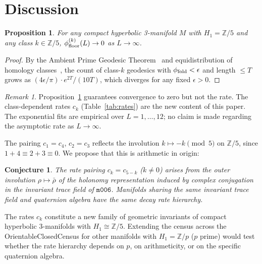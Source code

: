 \documentclass[11pt,a4paper]{article}
\newtheorem{proposition}{Proposition}
\newtheorem{conjecture}{Conjecture}
\theoremstyle{remark}
\newtheorem{remark}{Remark}
\newcommand{\mfld}[1]{\texttt{#1}}
\newcommand{\Zfive}{\mathbb{Z}/5}
\begin{document}
\section{Discussion}
\label{sec:discussion}

\begin{proposition}
\label{prop:zero}
For any compact hyperbolic 3-manifold $M$ with $H_1=\Zfive$
and any class $k\in\Zfive$,
$\phi_{\rm floor}^{(k)}(L)\to 0$ as $L\to\infty$.
\end{proposition}

\begin{proof}
By the Ambient Prime Geodesic Theorem~\cite{BalogBiggs23} and
equidistribution of homology classes~\cite{Sunada85},
the count of class-$k$ geodesics with $\phi_{\rm fold}<\epsilon$
and length $\leq T$ grows as $(4\epsilon/\pi)\cdot e^{2T}/(10T)$,
which diverges for any fixed $\epsilon>0$.
\end{proof}

\begin{remark}
Proposition~\ref{prop:zero} guarantees convergence to zero but
not the rate. The class-dependent rates $c_k$ (Table~\ref{tab:rates})
are the new content of this paper.
The exponential fits are empirical over $L=1,\ldots,12$;
no claim is made regarding the asymptotic rate as $L\to\infty$.
\end{remark}

The pairing $c_1=c_4$, $c_2=c_3$ reflects the involution
$k\mapsto -k\pmod{5}$ on $\Zfive$, since $1+4\equiv 2+3\equiv 0$.
We propose that this is arithmetic in origin:

\begin{conjecture}
The rate pairing $c_k=c_{5-k}$ ($k\neq 0$) arises from the
outer involution $\rho\mapsto\bar{\rho}$ of the holonomy
representation induced by complex conjugation in the invariant
trace field of $\mfld{m006}$.
Manifolds sharing the same invariant trace field and quaternion
algebra have the same decay rate hierarchy.
\end{conjecture}

The rates $c_k$ constitute a new family of geometric invariants
of compact hyperbolic 3-manifolds with $H_1\cong\Zfive$.
Extending the census across the OrientableClosedCensus for
other manifolds with $H_1=\mathbb{Z}/p$ ($p$ prime) would test
whether the rate hierarchy depends on $p$, on arithmeticity,
or on the specific quaternion algebra.

\end{document}
